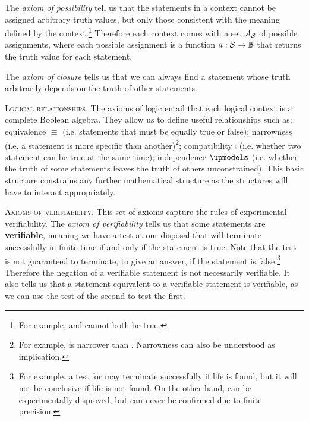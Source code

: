 \documentclass[10pt,twocolumn, nofootinbib]{revtex4-2}
\newcommand\partitle[1]{\textsc{#1}.}
\begin{document}
The \emph{axiom of possibility} tell us that the statements in a context cannot be assigned arbitrary truth values, but only those consistent with the meaning defined by the context.\footnote{For example,  and  cannot both be true.} Therefore each context comes with a set $\mathcal{A}_{\mathcal{S}}$ of possible assignments, where each possible assignment is a function $a : \mathcal{S} \to \mathbb{B}$ that returns the truth value for each statement.

The \emph{axiom of closure} tells us that we can always find a statement whose truth arbitrarily depends on the truth of other statements.

\partitle{Logical relationships} The axioms of logic entail that each logical context is a complete Boolean algebra. They allow us to define useful relationships such as: equivalence $\equiv$ (i.e. statements that must be equally true or false); narrowness (i.e. a statement is more specific than another)\footnote{For example,  is narrower than . Narrowness can also be understood as implication.}; compatibility $\comp$ (i.e. whether two statement can be true at the same time); independence $\indep$ (i.e. whether the truth of some statements leaves the truth of others unconstrained). This basic structure constrains any further mathematical structure as the structures will have to interact appropriately.

\partitle{Axioms of verifiability} This set of axioms capture the rules of experimental verifiability. The \emph{axiom of verifiability} tells us that some statements are \textbf{verifiable}, meaning we have a test at our disposal that will terminate successfully in finite time if and only if the statement is true. Note that the test is not guaranteed to terminate, to give an answer, if the statement is false.\footnote{For example, a test for  may terminate successfully if life is found, but it will not be conclusive if life is not found. On the other hand,  can be experimentally disproved, but can never be confirmed due to finite precision.} Therefore the negation of a verifiable statement is not necessarily verifiable. It also tells us that a statement equivalent to a verifiable statement is verifiable, as we can use the test of the second to test the first.
\end{document}
